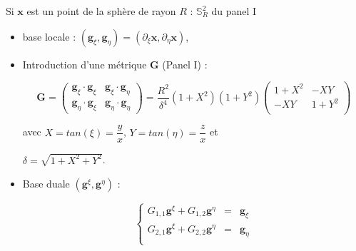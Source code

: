 \documentclass[11pt]{beamer}
\begin{document}
\begin{frame}

Si $\mathbf{x}$ est un point de la sphère de rayon $R$ : $\mathbb{S}_R^2$ du panel I

\begin{itemize}
\item base locale : $(\mathbf{g}_{\xi}, \mathbf{g}_{\eta} ) = ( \partial_{\xi} \mathbf{x}, \partial_{\eta} \mathbf{x} )$,
\pause


\item Introduction d'une métrique $\mathbf{G}$ (Panel I) :

\begin{equation}
\mathbf{G} = \begin{pmatrix}
\mathbf{g}_{\xi} \cdot \mathbf{g}_{\xi} & \mathbf{g}_{\xi} \cdot \mathbf{g}_{\eta} \\ 
\mathbf{g}_{\eta} \cdot \mathbf{g}_{\xi} & \mathbf{g}_{\eta} \cdot \mathbf{g}_{\eta}
\end{pmatrix} =
\dfrac{R^2}{\delta^4} (1+X^2)(1+Y^2)
\begin{pmatrix}
1+X^2 & -XY \\ 
-XY & 1+Y^2 \\
\end{pmatrix}
\end{equation}

avec $X=tan(\xi) = \dfrac{y}{x}$, $Y=tan(\eta) = \dfrac{z}{x}$ et

$\delta = \sqrt{1+X^2+Y^2}$.
\pause

\item Base duale $(\mathbf{g}^{\xi}, \mathbf{g}^{\eta})$ :

\begin{equation}
\left\{
\begin{array}{ccc}
G_{1,1}\mathbf{g}^{\xi} + G_{1,2}\mathbf{g}^{\eta} & = & \mathbf{g}_{\xi} \\ 
G_{2,1}\mathbf{g}^{\xi} + G_{2,2}\mathbf{g}^{\eta} & = & \mathbf{g}_{\eta} \\ 
\end{array} 
\right.
\end{equation}


\end{itemize}
\end{frame}



\end{document}
